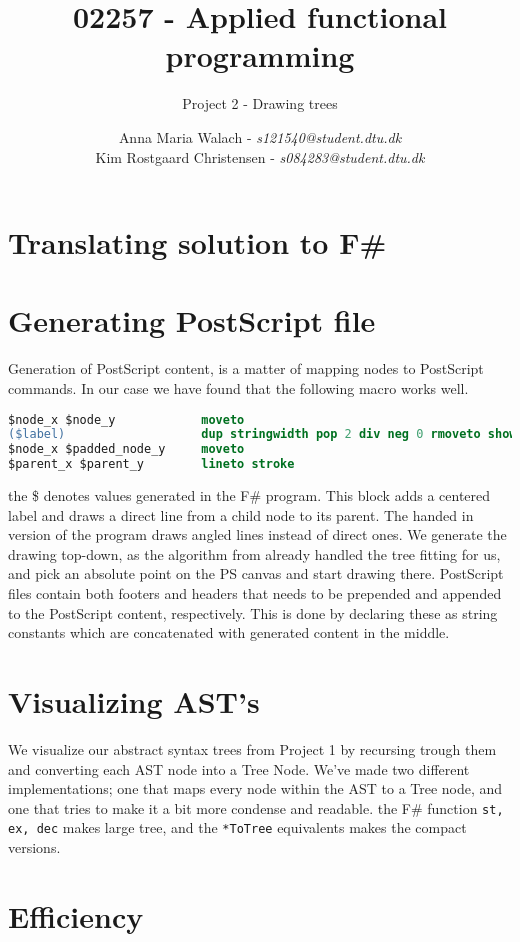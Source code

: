 \documentclass[10pt]{scrartcl}
\title{02257 - Applied functional programming}
\subtitle{Project 2 - Drawing trees}
\author{Anna Maria Walach - \textit {s121540@student.dtu.dk} \\ Kim Rostgaard Christensen - \textit {s084283@student.dtu.dk}}
\begin{document}
\maketitle
\section{Translating solution to F\#}
\section{Generating PostScript file}
Generation of PostScript content, is a matter of mapping nodes to PostScript commands. In our case we have found that the following macro works well.
\begin{lstlisting}[language=PostScript]
$node_x $node_y            moveto
($label)                   dup stringwidth pop 2 div neg 0 rmoveto show
$node_x $padded_node_y     moveto
$parent_x $parent_y        lineto stroke
\end{lstlisting}
the \$ denotes values generated in the F\# program. This block adds a centered label and draws a direct line from a child node to its parent. The handed in version of the program draws angled lines instead of direct ones.
We generate the drawing top-down, as the algorithm from \cite{kennedy1996functional} already handled the tree fitting for us, and pick an absolute point on the PS canvas and start drawing there.
PostScript files contain both footers and headers that needs to be prepended and appended to the PostScript content, respectively. This is done by declaring these as string constants which are concatenated with generated content in the middle.
\section{Visualizing AST's}
We visualize our abstract syntax trees from Project 1 by recursing trough them and converting each AST node into a Tree Node. We've made two different implementations; one that maps every node within the AST to a Tree node, and one that tries to make it a bit more condense and readable. the F\# function \texttt{st, ex, dec} makes large tree, and the \texttt{*ToTree} equivalents makes the compact versions.
\section{Efficiency}
\end{document}
